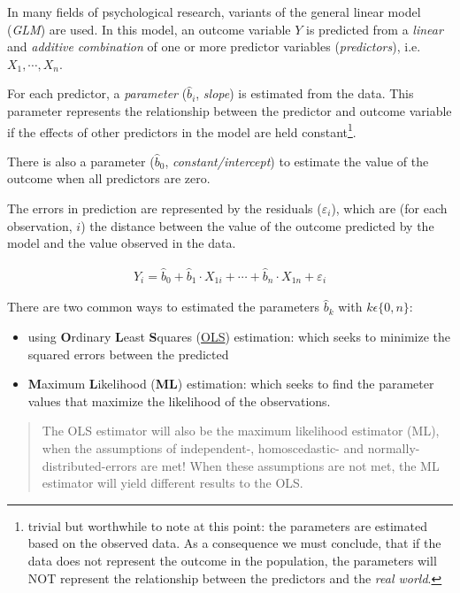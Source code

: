 \documentclass[
]{article}
\providecommand{\tightlist}{%
  \setlength{\itemsep}{0pt}\setlength{\parskip}{0pt}}
\begin{document}
In many fields of psychological research, variants of the general linear model (\emph{GLM}) are used. In this model, an outcome variable \(Y\) is predicted from a \emph{linear} and \emph{additive combination} of one or more predictor variables (\emph{predictors}), i.e.~\(X_1, \cdots, X_n\).

For each predictor, a \emph{parameter} (\(\hat{b}_i\), \emph{slope}) is estimated from the data. This parameter represents the relationship between the predictor and outcome variable if the effects of other predictors in the model are held constant\footnote{ trivial but worthwhile to note at this point: the parameters are estimated based on the observed data. As a consequence we must conclude, that if the data does not represent the outcome in the population, the parameters will NOT represent the relationship between the predictors and the \emph{real world}.}.

There is also a parameter (\(\hat{b}_0\), \emph{constant/intercept}) to estimate the value of the outcome when all predictors are zero.

The errors in prediction are represented by the residuals (\(\varepsilon_i\)), which are (for each observation, \(i\)) the distance between the value of the outcome predicted by the model and the value observed in the data.

\[\begin{array}{c}
  \hat{Y}_i = \hat{b}_0 + \hat{b}_1 \cdot X_{1i} + \cdots + \hat{b}_n \cdot X_{1n} + \varepsilon_i
\end{array}\]

There are two common ways to estimated the parameters \(\hat{b}_k\) with \(k \epsilon \{0,n\}\):

\begin{itemize}
\tightlist
\item
  using \textbf{O}rdinary \textbf{L}east \textbf{S}quares (\href{https://phet.colorado.edu/sims/html/least-squares-regression/latest/least-squares-regression_en.html}{OLS}) estimation: which seeks to minimize the squared errors between the predicted
\item
  \textbf{M}aximum \textbf{L}ikelihood (\textbf{ML}) estimation: which seeks to find the parameter values that maximize the likelihood of the observations.
\end{itemize}

\begin{quote}
The OLS estimator will also be the maximum likelihood estimator (ML), when the assumptions of independent-, homoscedastic- and normally-distributed-errors are met! When these assumptions are not met, the ML estimator will yield different results to the OLS.
\end{quote}
\end{document}
